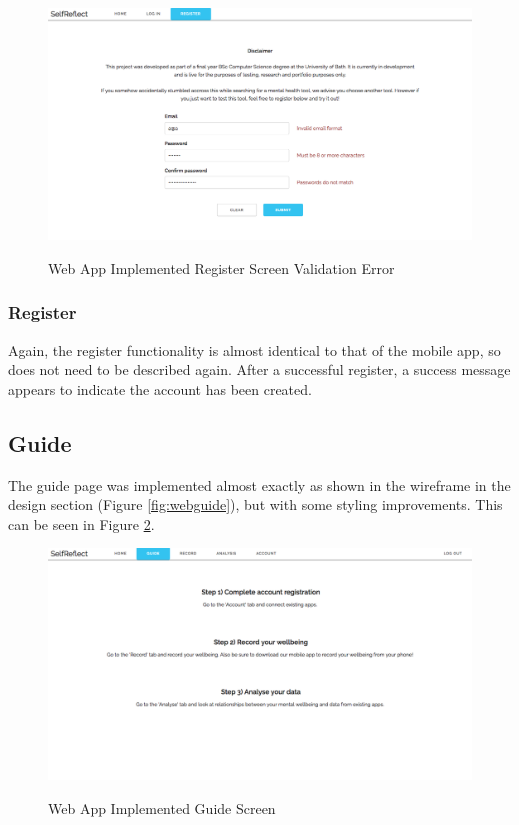 \documentclass[11pt,openright,a4paper]{report}
\begin{document}
\begin{figure}[ht]
\centering
\caption{Web App Implemented Register Screen Validation Error}
\includegraphics[width=\textwidth]{i/webregistererror.png}
\label{fig:webregistererror}
\end{figure}


\subsubsection{Register}
Again, the register functionality is almost identical to that of the mobile app, so does not need to be described again. After a successful register, a success message appears to indicate the account has been created.

\subsection{Guide} \label{subsec:guide}
The guide page was implemented almost exactly as shown in the wireframe in the design section (Figure \ref{fig:webguide}), but with some styling improvements. This can be seen in Figure \ref{fig:webguideimpl}.

\begin{figure}[ht]
\centering
\caption{Web App Implemented Guide Screen}
\includegraphics[width=\textwidth]{i/webguideimpl.png}
\label{fig:webguideimpl}
\end{figure}
\end{document}
